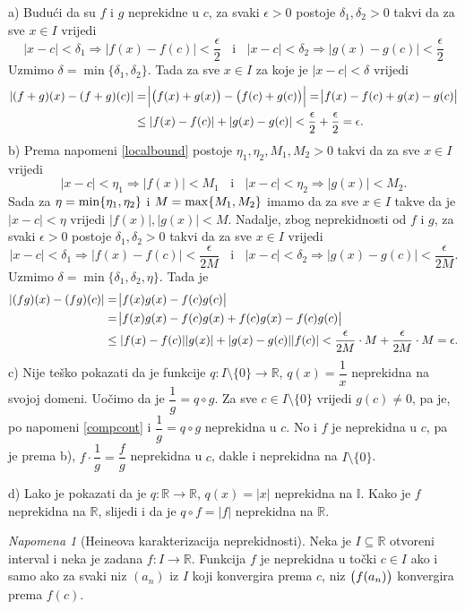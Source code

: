 \documentclass{book}
\let\originalleft\left
\let\originalright\right
\renewcommand{\left}{\mathopen{}\mathclose\bgroup\originalleft}
\renewcommand{\right}{\aftergroup\egroup\originalright}
\renewenvironment{proof}{%
    \vspace{-\parskip}\begin{oldproof}%
    }{%
    \end{oldproof}%
}
\theoremstyle{definition}
\theoremstyle{definition}
\theoremstyle{remark}
\newtheorem{remark}{Napomena}
\begin{document}
\begin{proof}
a) Budući da su $f$ i $g$ neprekidne u $c$, za svaki $\epsilon>0$ postoje $\delta_1, \delta_2>0$ takvi da za sve $x\in I$ vrijedi
$$|x-c|<\delta_1\Longrightarrow |f(x)-f(c)|<\dfrac{\epsilon}{2}\;\;\text{ i }\;\; |x-c|<\delta_2\Longrightarrow |g(x)-g(c)|<\dfrac{\epsilon}{2}$$
Uzmimo $\delta=\min\{\delta_1, \delta_2\}$. Tada za sve $x\in I$ za koje je $|x-c|<\delta$ vrijedi
\begin{align*}
|(f+g)(x)-(f+g)(c)|&=\abs{\left(f(x)+g(x)\right)-\left(f(c)+g(c)\right)}=\abs{f(x)-f(c)+g(x)-g(c)}\\
&\leq |f(x)-f(c)|+|g(x)-g(c)|<\dfrac{\epsilon}{2}+\dfrac{\epsilon}{2}=\epsilon.
\end{align*}
b) Prema napomeni \ref{localbound} postoje $\eta_1, \eta_2, M_1, M_2>0$ takvi da za sve $x\in I$ vrijedi
$$|x-c|<\eta_1\Longrightarrow |f(x)|<M_1\;\;\text{ i }\;\; |x-c|<\eta_2\Longrightarrow |g(x)|<M_2.$$
Sada za $\eta=\min\left\{\eta_1, \eta_2\right\}$ i $M=\max\left\{M_1, M_2\right\}$ imamo da za sve $x\in I$ takve da je $|x-c|<\eta$ vrijedi $|f(x)|, |g(x)|<M$. Nadalje, zbog neprekidnosti od $f$ i $g$, za svaki $\epsilon>0$ postoje $\delta_1, \delta_2>0$ takvi da za sve $x\in I$ vrijedi
$$|x-c|<\delta_1\Longrightarrow |f(x)-f(c)|<\dfrac{\epsilon}{2M}\;\;\text{ i }\;\; |x-c|<\delta_2\Longrightarrow |g(x)-g(c)|<\dfrac{\epsilon}{2M}.$$
Uzmimo $\delta=\min\{\delta_1, \delta_2, \eta\}$. Tada je
\begin{align*}
|(fg)(x)-(fg)(c)|&=\abs{f(x)g(x)-f(c)g(c)}\\
&=\abs{f(x)g(x)-f(c)g(x)+f(c)g(x)-f(c)g(c)}\\
&\leq |f(x)-f(c)||g(x)|+|g(x)-g(c)||f(c)|<\dfrac{\epsilon}{2M}\cdot M+\dfrac{\epsilon}{2M}\cdot M=\epsilon.
\end{align*}
c) Nije teško pokazati da je funkcije $q : I\setminus\{0\}\to \mathbb{R}$, $q(x)=\dfrac{1}{x}$ neprekidna na svojoj domeni. Uočimo da je $\dfrac{1}{g}=q\circ g$. Za sve $c\in I\setminus\{0\}$ vrijedi $g(c)\neq 0$, pa je, po napomeni \ref{compcont} i $\dfrac{1}{g}=q\circ g$ neprekidna u $c$. No i $f$ je neprekidna u $c$, pa je prema b), $f\cdot \dfrac{1}{g}=\dfrac{f}{g}$ neprekidna u $c$, dakle i neprekidna na $I\setminus\{0\}$.

d) Lako je pokazati da je $q : \mathbb{R}\to \mathbb{R}$, $q(x)=|x|$ neprekidna na $\mathbb{I}$. Kako je $f$ neprekidna na $\mathbb{R}$, slijedi i da je $q\circ f=|f|$ neprekidna na $\mathbb{R}$.
\end{proof}
\begin{remark}[Heineova karakterizacija neprekidnosti]
Neka je $I\subseteq \mathbb{R}$ otvoreni interval i neka je zadana $f : I\to \mathbb{R}$. Funkcija $f$ je neprekidna u točki $c\in I$ ako i samo ako za svaki niz $(a_n)$ iz $I$ koji konvergira prema $c$, niz $\left(f(a_n)\right)$ konvergira prema $f(c)$.
\end{remark}
\end{document}
